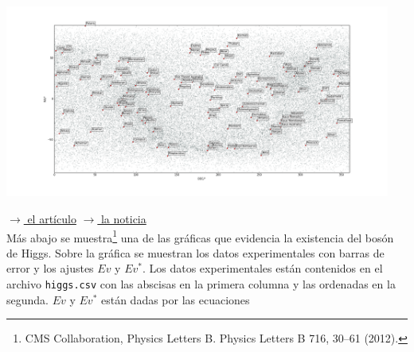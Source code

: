 \documentclass[11pt,letterpaper]{exam}
\begin{document}
\begin{questions}


\begin{center}
	\includegraphics[width=0.95\textwidth]{./starchart.png}
\end{center}

 \href{http://www.sciencedirect.com/science/article/pii/S0370269312008581}{$\rightarrow$ el artículo}  \href{http://www.nature.com/news/higgs-triumph-opens-up-field-of-dreams-1.10970}{$\rightarrow$ la noticia} \\ 
Más abajo se muestra\footnote{CMS Collaboration, Physics Letters B. Physics Letters B 716, 30–61 (2012).} una de las gráficas que evidencia la existencia del bosón de Higgs. Sobre la gráfica se muestran los datos experimentales con barras de error y los ajustes $Ev$ y $Ev^*$. Los datos experimentales están contenidos en el archivo \verb+higgs.csv+ con las abscisas en la primera columna y las ordenadas en la segunda. $Ev$ y $Ev^*$ están dadas por las ecuaciones


\end{questions}
\end{document}
